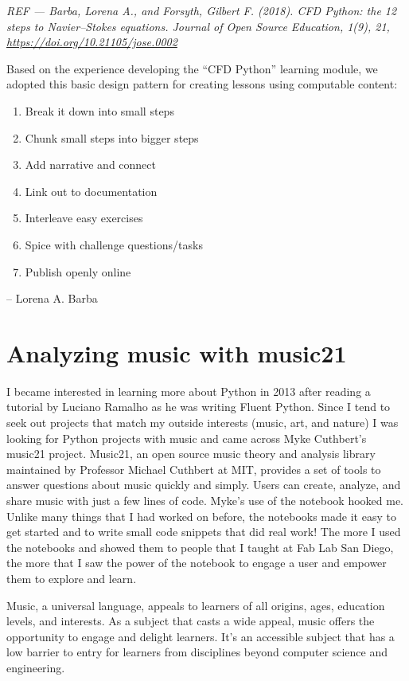 \documentclass[]{book}
\providecommand{\tightlist}{%
  \setlength{\itemsep}{0pt}\setlength{\parskip}{0pt}}
\begin{document}
\emph{REF --- Barba, Lorena A., and Forsyth, Gilbert F. (2018). CFD
Python: the 12 steps to Navier--Stokes equations. Journal of Open Source
Education, 1(9), 21, \url{https://doi.org/10.21105/jose.0002} }

Based on the experience developing the ``CFD Python'' learning module,
we adopted this basic design pattern for creating lessons using
computable content:

\begin{enumerate}
\def\labelenumi{\arabic{enumi}.}
\tightlist
\item
  Break it down into small steps
\item
  Chunk small steps into bigger steps
\item
  Add narrative and connect
\item
  Link out to documentation
\item
  Interleave easy exercises
\item
  Spice with challenge questions/tasks
\item
  Publish openly online
\end{enumerate}

-- Lorena A. Barba

\section{Analyzing music with
music21}\label{analyzing-music-with-music21}

I became interested in learning more about Python in 2013 after reading
a tutorial by Luciano Ramalho as he was writing Fluent Python. Since I
tend to seek out projects that match my outside interests (music, art,
and nature) I was looking for Python projects with music and came across
Myke Cuthbert's music21 project. Music21, an open source music theory
and analysis library maintained by Professor Michael Cuthbert at MIT,
provides a set of tools to answer questions about music quickly and
simply. Users can create, analyze, and share music with just a few lines
of code. Myke's use of the notebook hooked me. Unlike many things that I
had worked on before, the notebooks made it easy to get started and to
write small code snippets that did real work! The more I used the
notebooks and showed them to people that I taught at Fab Lab San Diego,
the more that I saw the power of the notebook to engage a user and
empower them to explore and learn.

Music, a universal language, appeals to learners of all origins, ages,
education levels, and interests. As a subject that casts a wide appeal,
music offers the opportunity to engage and delight learners. It's an
accessible subject that has a low barrier to entry for learners from
disciplines beyond computer science and engineering.
\end{document}
